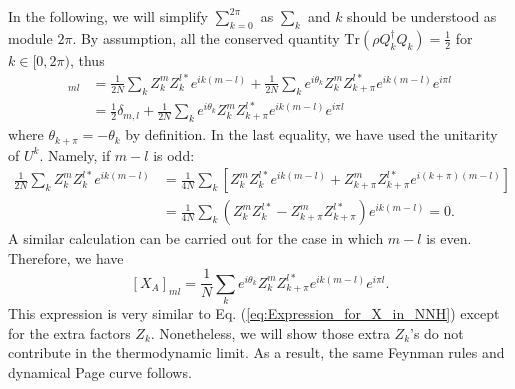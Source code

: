 \documentclass[aps,onecolumn,nofootinbib,superscriptaddress,notitlepage,longbibliography]{revtex4-1}
\def \Tr {\mathrm{Tr}}
\begin{document}
In the following, we will simplify %
$\sum_{k=0}^{2\pi}$ as $\sum_{k}$
and $k$ should be understood as module $2\pi$. By assumption, all
the conserved quantity $\Tr(\rho Q_{k}^{\dagger}Q_{k})=\frac{1}{2}$
for $k\in[0,2\pi)$, thus
\begin{align*}
[C_A]_{ml} & =\frac{1}{2N}\sum_{k}Z_{k}^{m}Z_{k}^{l*}e^{ik(m-l)}+\frac{1}{2N}\sum_{k}e^{i\theta_{k}}Z_{k}^{m}Z_{k+\pi}^{l*}e^{ik(m-l)}e^{i\pi l}\\
 & =\frac{1}{2}\delta_{m,l}+\frac{1}{2N}\sum_{k}e^{i\theta_{k}}Z_{k}^{m}Z_{k+\pi}^{l*}e^{ik(m-l)}e^{i\pi l}
\end{align*}
where $\theta_{k+\pi}=-\theta_{k}$ by definition. In the last equality, we have
used the unitarity of $U^{k}$. Namely, if $m-l$ is odd:
\begin{align*}
\frac{1}{2N}\sum_{k}Z_{k}^{m}Z_{k}^{l*}e^{ik(m-l)} & =\frac{1}{4N}\sum_{k}[Z_{k}^{m}Z_{k}^{l*}e^{ik(m-l)}+Z_{k+\pi}^{m}Z_{k+\pi}^{l*}e^{i(k+\pi)(m-l)}]\\
 & =\frac{1}{4N}\sum_{k}(Z_{k}^{m}Z_{k}^{l*}-Z_{k+\pi}^{m}Z_{k+\pi}^{l*})e^{ik(m-l)}=0.
\end{align*}
A similar calculation can be carried out for the case in which %
$m-l$ is even. Therefore, we %
have 
\[
[X_A]_{ml}=\frac{1}{N}\sum_{k}e^{i\theta_{k}}Z_{k}^{m}Z_{k+\pi}^{l*}e^{ik(m-l)}e^{i\pi l}.
\]
This expression is very similar to Eq. (\ref{eq:Expression_for_X_in_NNH})
except for the extra factors %
$Z_{k}$. Nonetheless, we will show those extra
$Z_{k}$'s do %
not contribute %
in the thermodynamic limit. As a result,
the same Feynman rules and dynamical Page curve %
follows. 
\end{document}
